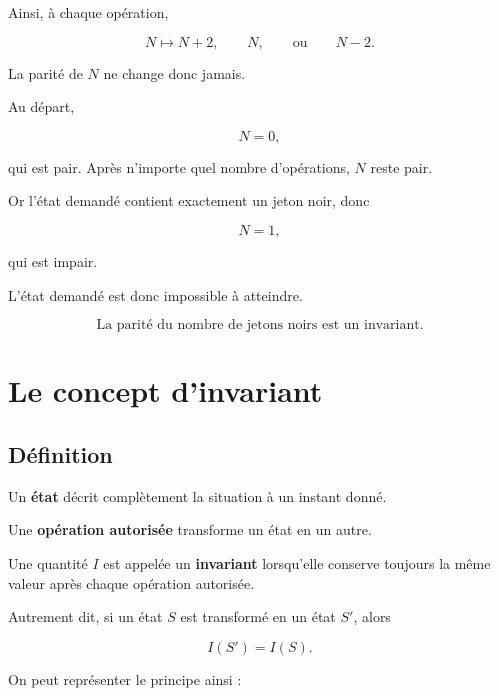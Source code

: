 Ainsi, à chaque opération,

\[
N\longmapsto N+2,\qquad N,\qquad\text{ou}\qquad N-2.
\]

La parité de \(N\) ne change donc jamais.

Au départ,

\[
N=0,
\]

qui est pair. Après n'importe quel nombre d'opérations, \(N\) reste pair.

Or l'état demandé contient exactement un jeton noir, donc

\[
N=1,
\]

qui est impair.

L'état demandé est donc impossible à atteindre.

\[
\boxed{
\text{La parité du nombre de jetons noirs est un invariant.}
}
\]

\section{Le concept d'invariant}

\subsection{Définition}

Un \textbf{état} décrit complètement la situation à un instant donné.

Une \textbf{opération autorisée} transforme un état en un autre.

Une quantité \(I\) est appelée un \textbf{invariant} lorsqu'elle conserve
toujours la même valeur après chaque opération autorisée.

Autrement dit, si un état \(S\) est transformé en un état \(S'\), alors

\[
\boxed{I(S')=I(S).}
\]

On peut représenter le principe ainsi :

\begin{center}
\end{center}

